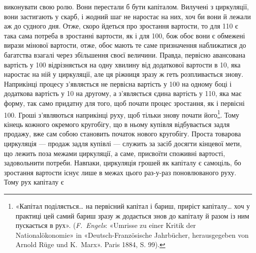 \parcont{}  %
виконувати свою ролю. Вони перестали б бути капіталом. Вилучені
з циркуляції, вони застигають у скарб, і жодний шаг не наростає
на них, хоч би вони й лежали аж до судного дня. Отже,
скоро йдеться про зростання вартости, то для 110
є така сама потреба в зростанні вартости, як і для 100, бож обоє вони є обмежені вирази мінової вартости,
отже, обоє мають те саме призначення наближатися до багатства
взагалі через збільшення своєї величини. Правда, первісно авансована
вартість у 100 відрізняється на одну хвилину
від додаткової вартости в 10, яка наростає
на ній у циркуляції, але ця ріжниця зразу ж геть розпливається
знову. Наприкінці процесу з’являється не первісна вартість
у 100 на одному боці і додаткова вартість у
10 на другому, а з’являється єдина вартість у
110, яка має форму, так само придатну для того,
щоб почати процес зростання, як і первісні 100.
Гроші з’являються наприкінці руху, щоб тільки знову почати
його\footnote{
«Капітал поділяється\dots{} на первісний капітал і бариш, приріст
капіталу\dots{} хоч у практиці цей самий бариш зразу ж додається знов до
капіталу й разом із ним пускається в рух». (\emph{F.~Engels}: «Umrisse zu
einer Kritik der Nationalökonomie» in «Deutsch-Französische Jahrbücher,
herausgegeben von Arnold Rüge und K.~Marx». Paris 1884, S. 99).
}. Тому кінець кожного окремого кругобігу, що в ньому
купівля відбувається задля продажу, вже сам собою становить
початок нового кругобігу. Проста товарова циркуляція — продаж
задля купівлі — служить за засіб досягти кінцевої мети,
що лежить поза межами циркуляції, а саме, присвоїти споживні
вартості, задовольнити потреби. Навпаки, циркуляція грошей
як капіталу є самоціль, бо зростання вартости існує лише в межах
цього раз-у-раз поновлюваного руху. Тому рух капіталу є
